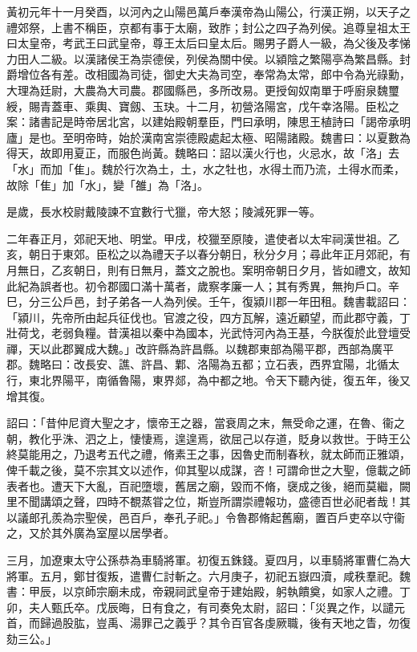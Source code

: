 \begin{pinyinscope}
黃初元年十一月癸酉，以河內之山陽邑萬戶奉漢帝為山陽公，行漢正朔，以天子之禮郊祭，上書不稱臣，京都有事于太廟，致胙；封公之四子為列侯。追尊皇祖太王曰太皇帝，考武王曰武皇帝，尊王太后曰皇太后。賜男子爵人一級，為父後及孝悌力田人二級。以漢諸侯王為崇德侯，列侯為關中侯。以潁陰之繁陽亭為繁昌縣。封爵增位各有差。改相國為司徒，御史大夫為司空，奉常為太常，郎中令為光祿勳，大理為廷尉，大農為大司農。郡國縣邑，多所改易。更授匈奴南單于呼廚泉魏璽綬，賜青蓋車、乘輿、寶劔、玉玦。十二月，初營洛陽宮，戊午幸洛陽。臣松之案：諸書記是時帝居北宮，以建始殿朝羣臣，門曰承明，陳思王植詩曰「謁帝承明廬」是也。至明帝時，始於漢南宮崇德殿處起太極、昭陽諸殿。魏書曰：以夏數為得天，故即用夏正，而服色尚黃。魏略曰：詔以漢火行也，火忌水，故「洛」去「水」而加「隹」。魏於行次為土，土，水之牡也，水得土而乃流，土得水而柔，故除「隹」加「水」，變「雒」為「洛」。

是歲，長水校尉戴陵諫不宜數行弋獵，帝大怒；陵減死罪一等。

二年春正月，郊祀天地、明堂。甲戌，校獵至原陵，遣使者以太牢祠漢世祖。乙亥，朝日于東郊。臣松之以為禮天子以春分朝日，秋分夕月；尋此年正月郊祀，有月無日，乙亥朝日，則有日無月，蓋文之脫也。案明帝朝日夕月，皆如禮文，故知此紀為誤者也。初令郡國口滿十萬者，歲察孝廉一人；其有秀異，無拘戶口。辛巳，分三公戶邑，封子弟各一人為列侯。壬午，復潁川郡一年田租。魏書載詔曰：「潁川，先帝所由起兵征伐也。官渡之役，四方瓦解，遠近顧望，而此郡守義，丁壯荷戈，老弱負糧。昔漢祖以秦中為國本，光武恃河內為王基，今朕復於此登壇受禪，天以此郡翼成大魏。」改許縣為許昌縣。以魏郡東部為陽平郡，西部為廣平郡。魏略曰：改長安、譙、許昌、鄴、洛陽為五都；立石表，西界宜陽，北循太行，東北界陽平，南循魯陽，東界郯，為中都之地。令天下聽內徙，復五年，後又增其復。

詔曰：「昔仲尼資大聖之才，懷帝王之器，當衰周之末，無受命之運，在魯、衞之朝，教化乎洙、泗之上，悽悽焉，遑遑焉，欲屈己以存道，貶身以救世。于時王公終莫能用之，乃退考五代之禮，脩素王之事，因魯史而制春秋，就太師而正雅頌，俾千載之後，莫不宗其文以述作，仰其聖以成謀，咨！可謂命世之大聖，億載之師表者也。遭天下大亂，百祀墮壞，舊居之廟，毀而不脩，襃成之後，絕而莫繼，闕里不聞講頌之聲，四時不覩蒸甞之位，斯豈所謂崇禮報功，盛德百世必祀者哉！其以議郎孔羨為宗聖侯，邑百戶，奉孔子祀。」令魯郡脩起舊廟，置百戶吏卒以守衞之，又於其外廣為室屋以居學者。

三月，加遼東太守公孫恭為車騎將軍。初復五銖錢。夏四月，以車騎將軍曹仁為大將軍。五月，鄭甘復叛，遣曹仁討斬之。六月庚子，初祀五嶽四瀆，咸秩羣祀。魏書：甲辰，以京師宗廟未成，帝親祠武皇帝于建始殿，躬執饋奠，如家人之禮。丁卯，夫人甄氏卒。戊辰晦，日有食之，有司奏免太尉，詔曰：「災異之作，以譴元首，而歸過股肱，豈禹、湯罪己之義乎？其令百官各虔厥職，後有天地之眚，勿復劾三公。」


\end{pinyinscope}
